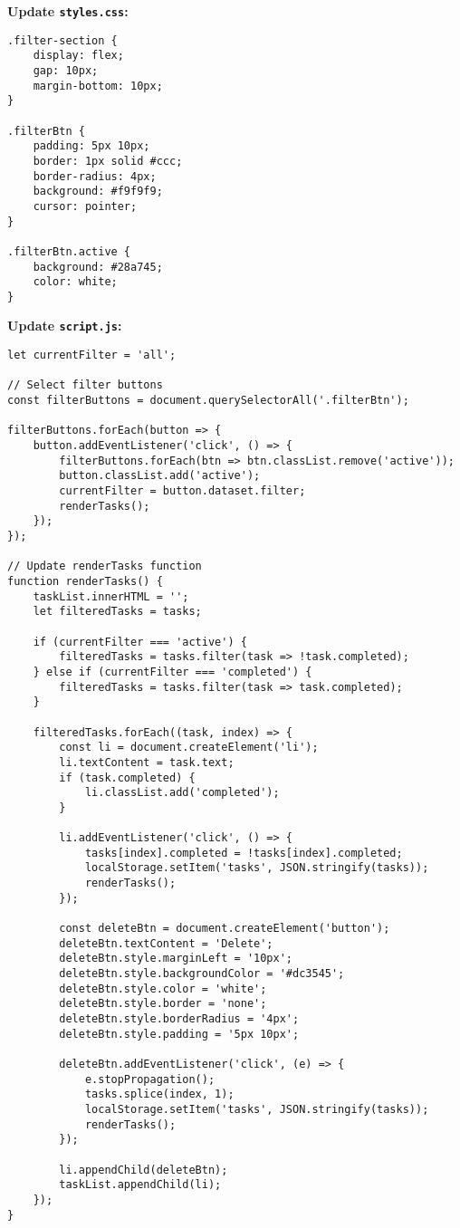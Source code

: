 \documentclass[a4paper,12pt]{article}
\begin{document}
\textbf{Update \texttt{styles.css}:}
\lstset{language=CSS}
\begin{lstlisting}
.filter-section {
    display: flex;
    gap: 10px;
    margin-bottom: 10px;
}

.filterBtn {
    padding: 5px 10px;
    border: 1px solid #ccc;
    border-radius: 4px;
    background: #f9f9f9;
    cursor: pointer;
}

.filterBtn.active {
    background: #28a745;
    color: white;
}
\end{lstlisting}

\textbf{Update \texttt{script.js}:}
\lstset{language=JavaScript}
\begin{lstlisting}
let currentFilter = 'all';

// Select filter buttons
const filterButtons = document.querySelectorAll('.filterBtn');

filterButtons.forEach(button => {
    button.addEventListener('click', () => {
        filterButtons.forEach(btn => btn.classList.remove('active'));
        button.classList.add('active');
        currentFilter = button.dataset.filter;
        renderTasks();
    });
});

// Update renderTasks function
function renderTasks() {
    taskList.innerHTML = '';
    let filteredTasks = tasks;
    
    if (currentFilter === 'active') {
        filteredTasks = tasks.filter(task => !task.completed);
    } else if (currentFilter === 'completed') {
        filteredTasks = tasks.filter(task => task.completed);
    }
    
    filteredTasks.forEach((task, index) => {
        const li = document.createElement('li');
        li.textContent = task.text;
        if (task.completed) {
            li.classList.add('completed');
        }
        
        li.addEventListener('click', () => {
            tasks[index].completed = !tasks[index].completed;
            localStorage.setItem('tasks', JSON.stringify(tasks));
            renderTasks();
        });
        
        const deleteBtn = document.createElement('button');
        deleteBtn.textContent = 'Delete';
        deleteBtn.style.marginLeft = '10px';
        deleteBtn.style.backgroundColor = '#dc3545';
        deleteBtn.style.color = 'white';
        deleteBtn.style.border = 'none';
        deleteBtn.style.borderRadius = '4px';
        deleteBtn.style.padding = '5px 10px';
        
        deleteBtn.addEventListener('click', (e) => {
            e.stopPropagation();
            tasks.splice(index, 1);
            localStorage.setItem('tasks', JSON.stringify(tasks));
            renderTasks();
        });
        
        li.appendChild(deleteBtn);
        taskList.appendChild(li);
    });
}
\end{lstlisting}
\end{document}
